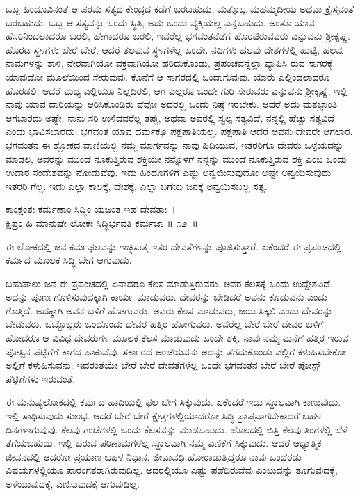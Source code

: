ಒಬ್ಬ ಹಿಂದೂವಿನಂತೆ ಆ ಪರಮ ಸತ್ಯದ ಕೇಂದ್ರದ ಕಡೆಗೆ ಬರಬಹುದು, ಮತ್ತೊಬ್ಬ ಮಹಮ್ಮದೀಯ ಅಥವಾ ಕ್ರೈಸ್ತನಂತೆ ಬರಬಹುದು. ಒಬ್ಬ ಆ ಸತ್ಯವನ್ನು ಒಂದು ಸ್ಥಿತಿ, ಅದು ಒಂದು ವ್ಯಕ್ತಿಯಲ್ಲ ಎನ್ನಬಹುದು. ಅಂತೂ ಯಾವ ಹೆಸರಿನಿಂದಲಾದರೂ ಬರಲಿ, ಹೇಗಾದರೂ ಬರಲಿ, ಇವರೆಲ್ಲ ಭಗವಂತನೆಡೆಗೆ ಹೊರಟಿರುವವರು ಎನ್ನುವನು ಶ‍್ರೀಕೃಷ್ಣ. ಹೊರಟ ಸ್ಥಳಗಳು ಬೇರೆ ಬೇರೆ, ಆದರೆ ತಲಪುವ ಸ್ಥಳಗಳೆಲ್ಲ ಒಂದೇ. ನದಿಗಳು ಹಲವು ದೇಶಗಳಲ್ಲಿ ಹುಟ್ಟಿ, ಹಲವು ನಾಮಗಳನ್ನು ತಾಳಿ, ನೇರವಾಗಿಯೋ ವಕ್ರವಾಗಿಯೋ ಹರಿದುಕೊಂಡು, ಪ್ರಪಂಚವನ್ನೆಲ್ಲಾ ವ್ಯಾಪಿಸಿ ರುವ ಸಾಗರಕ್ಕೆ ಯಾವುದೋ ಮೂಲೆಯಿಂದ ಸೇರುವುವು. ಕೊನೆಗೆ ಆ ಸಾಗರದಲ್ಲಿ ಒಂದಾಗುವುವು. ಯಾರು ಎಲ್ಲಿಂದಲಾದರೂ ಹೊರಡಲಿ, ಆದರೆ ಮಧ್ಯ ಎಲ್ಲಿಯೂ ನಿಲ್ಲದಿರಲಿ, ಆಗ ಎಲ್ಲರೂ ಒಂದೇ ಗುರಿ ಸೇರುವರು ಎನ್ನುವನು ಶ‍್ರೀಕೃಷ್ಣ. ಇಲ್ಲಿ ನಾವು ಯಾವ ದಾರಿಯನ್ನು ಆರಿಸಿಕೊಂಡಿರು ವೆವೋ ಅದರಲ್ಲಿ ಒಂದು ನಿಷ್ಠೆ ಇರಬೇಕು. ಆದರೆ ಅದು ಮತಭ್ರಾಂತಿ ಆಗಬಾರದು ಅಷ್ಟೇ. ನಾನು ಸರಿ ಉಳಿದವರೆಲ್ಲ ತಪ್ಪು, ಅಥವಾ ಅವರಲ್ಲಿ ಸ್ವಲ್ಪ ಸತ್ಯವಿದೆ, ನನ್ನಲ್ಲಿ ಹೆಚ್ಚು ಸತ್ಯವಿದೆ ಎಂದು ಭಾವಿಸಬಾರದು. ಭಗವಂತ ಯಾವ ಧರ್ಮಕ್ಕೂ ಪಕ್ಷಪಾತಿಯಲ್ಲ. ಪಕ್ಷಪಾತಿ ಆದರೆ ಅವನು ದೇವರೇ ಆಗಲಾರ. ಭಗವಂತನ ಈ ಶ್ಲೋಕದ ವಾಣಿಯಲ್ಲಿ ನಮ್ಮ ಮಾರ್ಗವನ್ನು ನಾವು ಹಿಡಿಯುವ, ಇತರರಿಗೂ ದೇವರು ಒಳ್ಳೆಯದನ್ನು ಮಾಡಲಿ, ಅವರನ್ನು ಮುಂದೆ ನೂಕುತ್ತಿರುವ ಶಕ್ತಿಯೇ ನನ್ನೊಳಗೆ ನನ್ನನ್ನು ಮುಂದೆ ನೂಕುತ್ತಿರುವ ಶಕ್ತಿ ಎಂಬ ಒಂದು ಉದಾರ ಸಂದೇಶವನ್ನು ನೋಡುವೆವು. ಇದು ಹಿಂದೂಗಳಿಗೆ ಎಷ್ಟು ಅನ್ವಯಿಸುವುದೋ ಅಷ್ಟೇ ಅನ್ವಯಿಸುವುದು ಇತರರಿ ಗೆಲ್ಲ. ಇದು ಎಲ್ಲಾ ಕಾಲಕ್ಕೆ, ದೇಶಕ್ಕೆ, ಎಲ್ಲಾ ಬಗೆಯ ಜನಕ್ಕೆ ಅನ್ವಯಿಸಬಲ್ಲ ಸತ್ಯ.

\begin{shloka}
ಕಾಂಕ್ಷಂತಃ ಕರ್ಮಣಾಂ ಸಿದ್ಧಿಂ ಯಜಂತ ಇಹ ದೇವತಾಃ~।\\ಕ್ಷಿಪ್ರಂ ಹಿ ಮಾನುಷೇ ಲೋಕೇ ಸಿದ್ಧಿರ್ಭವತಿ ಕರ್ಮಜಾ \hfill॥ ೧೨~॥
\end{shloka}

\begin{artha}
ಈ ಲೋಕದಲ್ಲಿ ಜನ ಕರ್ಮಫಲವನ್ನು ಇಚ್ಛಿಸುತ್ತ ಇತರ ದೇವತೆಗಳನ್ನು ಪೂಜಿಸುತ್ತಾರೆ. ಏಕೆಂದರೆ ಈ ಪ್ರಪಂಚದಲ್ಲಿ ಕರ್ಮದ ಮೂಲಕ ಸಿದ್ಧಿ ಬೇಗ ಆಗುವುದು.
\end{artha}

ಬಹುಪಾಲು ಜನ ಈ ಪ್ರಪಂಚದಲ್ಲಿ ಏನಾದರೂ ಕೆಲಸ ಮಾಡುತ್ತಿರುವರು. ಅವರ ಕೆಲಸಕ್ಕೆ ಒಂದು ಉದ್ದೇಶವಿದೆ. ಅದನ್ನು ಪೂರ್ಣಗೊಳಿಸುವುದಕ್ಕಾಗಿ ಕಾರ್ಯ ಮಾಡುವರು. ದೇವರನ್ನು ಬೇಡಿದರೆ ಅವನು ಕೊಡುವನು ಎಂದು ಗೊತ್ತಿದೆ. ಅದಕ್ಕಾಗಿ ಅವನ ಬಳಿಗೆ ಹೋಗುವರು. ಅವರು ಕೆಲಸ ಮಾಡುವರು, ಜಯ ಸಿಕ್ಕಲಿ ಎಂದು ದೇವರನ್ನು ಬೇಡುವರು. ಒಬ್ಬೊಬ್ಬರು ಒಂದೊಂದು ದೇವರ ಹತ್ತಿರ ಹೋಗುವರು. ಅವರೆಲ್ಲ ಬೇರೆ ಬೇರೆ ದೇವರ ಬಳಿಗೆ ಹೋದರೂ ಆ ವಿವಿಧ ದೇವರುಗಳ ಮೂಲಕ ಕೆಲಸ ಮಾಡುವುದು ಒಂದೇ ಶಕ್ತಿ. ನಾವು ನಮ್ಮ ಮನೆಗೆ ಹತ್ತಿರ ಇರುವ ಪೋಸ್ಟಿನ ಪೆಟ್ಟಿಗೆಗೆ ಕಾಗದ ಹಾಕುವೆವು. ಸರ್ಕಾರದ ಅಂಚೆಯವನು ಅದನ್ನು ತೆಗೆದುಕೊಂಡು ಎಲ್ಲಿಗೆ ಕಳುಹಿಸಬೇಕೋ ಅಲ್ಲಿಗೆ ಕಳುಹಿಸುವನು. ಇದರಂತೆಯೇ ಬೇರೆ ಬೇರೆ ದೇವತೆಗಳೆಲ್ಲ ಒಂದೇ ಭಗವಂತನ ಬೇರೆ ಬೇರೆ ಪೋಸ್ಟ್ ಪೆಟ್ಟಿಗೆಗಳು ಇರುವಂತೆ.

ಈ ಮನುಷ್ಯಲೋಕದಲ್ಲಿ ಕರ್ಮದ ಹಾದಿಯಲ್ಲಿ ಫಲ ಬೇಗ ಸಿಕ್ಕುವುದು. ಏಕೆಂದರೆ ಇದು ಸ್ಥೂಲವಾಗಿ ಕಾಣುವುದು. ಇಲ್ಲಿ ಸಾಧಿಸುವುದು ಸುಲಭ. ಆದರೆ ಬೇರೆ ಬೇರೆ ಕ್ಷೇತ್ರಗಳಲ್ಲಿಯಾದರೋ ಸಿದ್ಧಿ ಪ್ರಾಪ್ತವಾಗಬೇಕಾದರೆ ಬಹಳ ದಿನಗಳಾಗುವುವು. ಕೆಲವು ಗಂಟೆಗಳಲ್ಲಿ ಒಂದು ಕೆಲಸವನ್ನು ಮಾಡಬಹುದು. ಹೊಲದಲ್ಲಿ ಬಿತ್ತಿ ಕೆಲವು ತಿಂಗಳಲ್ಲಿ ಬೆಳೆ ತೆಗೆಯಬಹುದು. ಇಲ್ಲಿ ಬರುವ ಪರಿಣಾಮಗಳೆಲ್ಲ ಸ್ಥೂಲವಾಗಿ ನಮ್ಮ ಎಣಿಕೆಗೆ ಸಿಕ್ಕುವುದು. ಆದರೆ ಆಧ್ಯಾತ್ಮಿಕ ಜೀವನದಲ್ಲಿ ಆದರೋ ಪ್ರಯಾಣ ಬಹಳ ನಿಧಾನ. ಜೀವಾವಧಿ ಹೋರಾಡುತ್ತಿದ್ದರೂ ನಾವು ಒಂದೆರಡು ವಿಷಯಗಳಲ್ಲಿಯೂ ಪಾರಂಗತರಾಗಿರುವುದಿಲ್ಲ. ಅದರಲ್ಲಿಯೂ ಎಷ್ಟು ಪಡೆದಿರುವೆವು ಎಂಬುದನ್ನು ತೂಗುವುದಕ್ಕೆ, ಅಳೆಯುವುದಕ್ಕೆ, ಎಣಿಸುವುದಕ್ಕೆ ಆಗುವುದಿಲ್ಲ.

